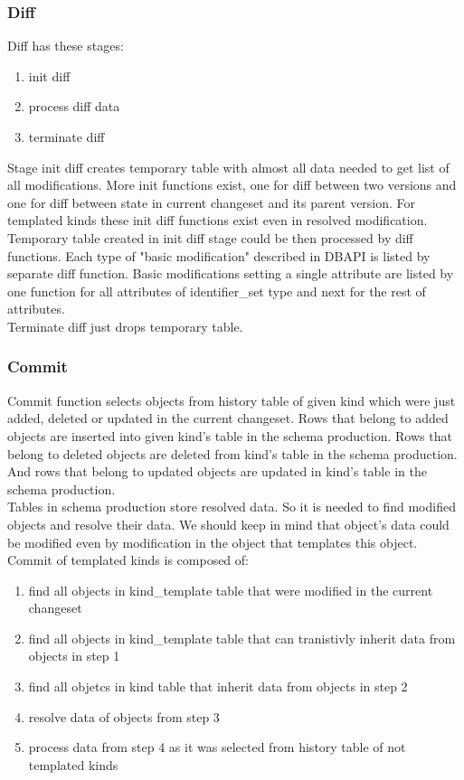 \documentclass[deska]{subfiles}
\begin{document}
\subsubsection{Diff}

Diff has these stages:
\begin{enumerate}
    \item init diff
    \item process diff data
    \item terminate diff
\end{enumerate}
Stage init diff creates temporary table with almost all data needed to get list of all modifications.
More init functions exist, one for diff between two versions and one for diff between state in current changeset and its parent version. For templated kinds these init diff functions exist even in resolved modification.\\

Temporary table created in init diff stage could be then processed by diff functions. Each type of "basic modification" described in DBAPI is listed by separate diff function. Basic modifications setting a single attribute are listed by one function for all attributes of identifier\_set type and next for the rest of attributes.\\

Terminate diff just drops temporary table.

\subsubsection{Commit}
Commit function selects objects from history table of given kind which were just added, deleted or updated in the current changeset. Rows that belong to added objects are inserted into given kind's table in the schema production. Rows that belong to deleted objects are deleted from kind's table in the schema production. And rows that belong to updated objects are updated in kind's table in the schema production.\\
Tables in schema production store resolved data. So it is needed to find modified objects and resolve their data. We should keep in mind that object's data could be modified even by modification in the object that templates this object.\\
Commit of templated kinds is composed of:
\begin{enumerate}
    \item find all objects in kind\_template table that were modified in the current changeset
    \item find all objects in kind\_template table that can tranistivly inherit data from objects in step 1
    \item find all objetcs in kind table that inherit data from objects in step 2
    \item resolve data of objects from step 3
    \item process data from step 4 as it was selected from history table of not templated kinds
\end{enumerate}
\end{document}
